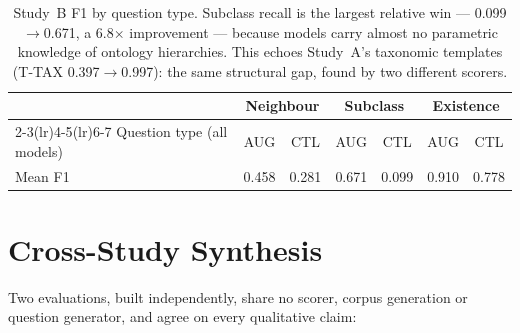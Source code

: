 \documentclass[11pt]{article}
\begin{document}
\begin{samepage}
\begin{table}[h]\centering\small
\begin{tabular}{lcccccc}
\toprule
 & \multicolumn{2}{c}{Neighbour} & \multicolumn{2}{c}{Subclass} & \multicolumn{2}{c}{Existence} \\
\cmidrule(lr){2-3}\cmidrule(lr){4-5}\cmidrule(lr){6-7}
Question type (all models) & AUG & CTL & AUG & CTL & AUG & CTL \\
\midrule
Mean F1 & 0.458 & 0.281 & 0.671 & 0.099 & 0.910 & 0.778 \\
\bottomrule
\end{tabular}
\caption{Study~B F1 by question type. Subclass recall is the largest relative win --- 0.099$\to$0.671,
a 6.8$\times$ improvement --- because models carry almost no parametric knowledge of ontology
hierarchies. This echoes Study~A's taxonomic templates (T-TAX 0.397$\to$0.997): the same
structural gap, found by two different scorers.}
\end{table}
\end{samepage}

\section{Cross-Study Synthesis}
Two evaluations, built independently, share no scorer, corpus generation or question generator,
and agree on every qualitative claim:
\end{document}
